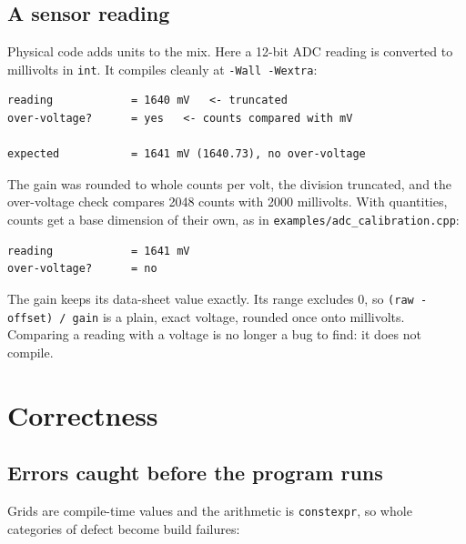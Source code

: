 \documentclass[11pt,a4paper]{article}
\newcommand{\code}[1]{\texttt{\small #1}}
\newcommand{\file}[1]{\texttt{\small #1}}
\begin{document}
\subsection{A sensor reading}

Physical code adds units to the mix. Here a 12-bit ADC reading is converted to
millivolts in \code{int}. It compiles cleanly at \code{-Wall -Wextra}:


\begin{lstlisting}[style=term]
reading            = 1640 mV   <- truncated
over-voltage?      = yes   <- counts compared with mV

expected           = 1641 mV (1640.73), no over-voltage
\end{lstlisting}

\noindent
The gain was rounded to whole counts per volt, the division truncated, and the
over-voltage check compares 2048 counts with 2000 millivolts. With quantities,
counts get a base dimension of their own, as in \file{examples/adc\_calibration.cpp}:


\begin{lstlisting}[style=term]
reading            = 1641 mV
over-voltage?      = no
\end{lstlisting}

\noindent
The gain keeps its data-sheet value exactly. Its range excludes 0, so
\code{(raw - offset) / gain} is a plain, exact voltage, rounded once onto
millivolts. Comparing a reading with a voltage is no longer a bug to find: it
does not compile.

\section{Correctness}\label{sec:correctness}

\subsection{Errors caught before the program runs}

Grids are compile-time values and the arithmetic is \code{constexpr}, so whole
categories of defect become build failures:


\end{document}
